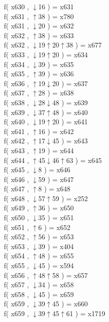 f( x630 , $\downarrow$16 ) = x631 \\
f( x631 , $\uparrow$38 ) = x780 \\
f( x631 , $\downarrow$20 ) = x632 \\
f( x632 , $\uparrow$38 ) = x633 \\
f( x632 , $\downarrow$19$\uparrow$20$\uparrow$38 ) = x677 \\
f( x633 , $\downarrow$19$\uparrow$20 ) = x634 \\
f( x634 , $\downarrow$39 ) = x635 \\
f( x635 , $\uparrow$39 ) = x636 \\
f( x636 , $\uparrow$19$\downarrow$20 ) = x637 \\
f( x637 , $\uparrow$28 ) = x638 \\
f( x638 , $\downarrow$28$\downarrow$48 ) = x639 \\
f( x639 , $\downarrow$37$\uparrow$48 ) = x640 \\
f( x640 , $\downarrow$19$\uparrow$20 ) = x641 \\
f( x641 , $\uparrow$16 ) = x642 \\
f( x642 , $\uparrow$17$\downarrow$45 ) = x643 \\
f( x643 , $\uparrow$19 ) = x644 \\
f( x644 , $\uparrow$45$\downarrow$46$\uparrow$63 ) = x645 \\
f( x645 , $\downarrow$8 ) = x646 \\
f( x646 , $\downarrow$59 ) = x647 \\
f( x647 , $\uparrow$8 ) = x648 \\
f( x648 , $\downarrow$57$\uparrow$59 ) = x252 \\
f( x649 , $\uparrow$36 ) = x650 \\
f( x650 , $\downarrow$35 ) = x651 \\
f( x651 , $\uparrow$6 ) = x652 \\
f( x652 , $\uparrow$56 ) = x653 \\
f( x653 , $\downarrow$39 ) = x404 \\
f( x654 , $\uparrow$48 ) = x655 \\
f( x655 , $\downarrow$45 ) = x594 \\
f( x656 , $\uparrow$48$\uparrow$58 ) = x657 \\
f( x657 , $\downarrow$34 ) = x658 \\
f( x658 , $\downarrow$45 ) = x659 \\
f( x659 , $\downarrow$39$\uparrow$45 ) = x660 \\
f( x659 , $\downarrow$39$\uparrow$45$\uparrow$61 ) = x1719 \\
